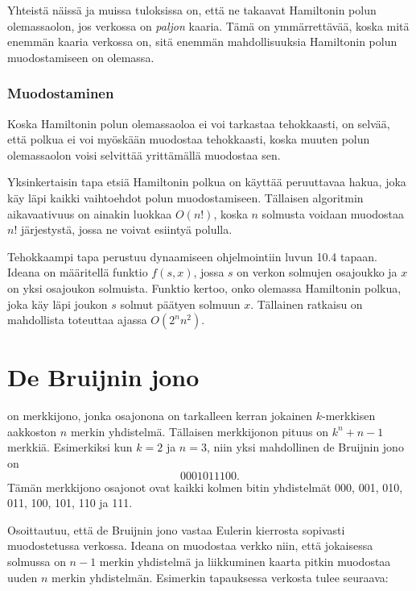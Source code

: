 Yhteistä näissä ja muissa tuloksissa on,
että ne takaavat Hamiltonin polun olemassaolon,
jos verkossa on \textit{paljon} kaaria.
Tämä on ymmärrettävää, koska mitä enemmän
kaaria verkossa on, sitä enemmän mahdollisuuksia
Hamiltonin polun muodostamiseen on olemassa.

\subsubsection{Muodostaminen}

Koska Hamiltonin polun olemassaoloa ei voi tarkastaa tehokkaasti,
on selvää, että polkua ei voi myöskään muodostaa tehokkaasti,
koska muuten polun olemassaolon voisi selvittää yrittämällä
muodostaa sen.

Yksinkertaisin tapa etsiä Hamiltonin polkua on käyttää
peruuttavaa hakua, joka käy läpi kaikki vaihtoehdot
polun muodostamiseen.
Tällaisen algoritmin aikavaativuus on ainakin luokkaa $O(n!)$,
koska $n$ solmusta voidaan muodostaa $n!$ järjestystä,
jossa ne voivat esiintyä polulla.

Tehokkaampi tapa perustuu dynaamiseen ohjelmointiin
luvun 10.4 tapaan.
Ideana on määritellä funktio $f(s,x)$,
jossa $s$ on verkon solmujen osajoukko ja
$x$ on yksi osajoukon solmuista.
Funktio kertoo, onko olemassa Hamiltonin polkua,
joka käy läpi joukon $s$ solmut päätyen solmuun $x$.
Tällainen ratkaisu on mahdollista toteuttaa ajassa $O(2^n n^2)$.

\section{De Bruijnin jono}


on merkkijono, jonka osajonona on tarkalleen
kerran jokainen $k$-merkkisen aakkoston
$n$ merkin yhdistelmä.
Tällaisen merkkijonon pituus on
$k^n+n-1$ merkkiä.
Esimerkiksi kun $k=2$ ja $n=3$,
niin yksi mahdollinen de Bruijnin jono on
\[0001011100.\]
Tämän merkkijono osajonot ovat kaikki 
kolmen bitin yhdistelmät
000, 001, 010, 011, 100, 101, 110 ja 111.

Osoittautuu, että de Bruijnin jono
vastaa Eulerin kierrosta sopivasti
muodostetussa verkossa.
Ideana on muodostaa verkko niin,
että jokaisessa solmussa on $n-1$
merkin yhdistelmä ja liikkuminen
kaarta pitkin muodostaa uuden
$n$ merkin yhdistelmän.
Esimerkin tapauksessa verkosta tulee seuraava:

